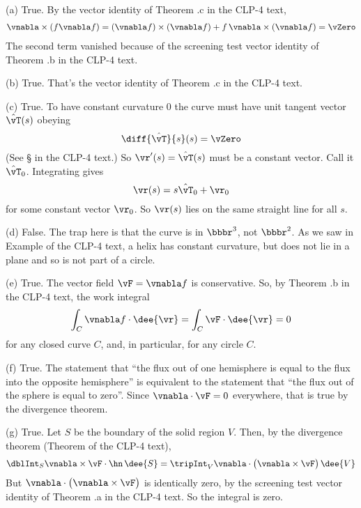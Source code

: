 \begin{solution} 
(a) True. By the vector identity of Theorem .c
in the CLP-4 text,
\begin{align*}
\vnabla\times(f \vnabla f )
=(\vnabla f) \times (\vnabla f)
  +f\,\vnabla\times (\vnabla f)
=\vZero
\end{align*}
The second term vanished because of the screening test vector identity
of Theorem .b in the CLP-4 text.

(b) True. That's the vector identity of Theorem .c in the CLP-4 text.

(c) True. To have constant curvature $0$ the curve must have 
unit tangent vector $\hat\vT(s)$ obeying
\begin{equation*}
\diff{\hat\vT}{s}(s)=\vZero
\end{equation*}
(See \S{} in the CLP-4 text.)
So $\vr'(s) = \hat\vT(s)$ must be a constant vector. Call it $\hat\vT_0$. Integrating gives
\begin{equation*}
\vr(s) = s\hat\vT_0 +\vr_0
\end{equation*}
for some constant vector $\vr_0$. So $\vr(s)$ lies
on the same straight line for all $s$.

(d) False. The trap here is that the curve is in $\bbbr^3$, not $\bbbr^2$. 
As we saw in Example  of the CLP-4 text, 
a helix has constant curvature, but does not lie in a plane and so 
is not part of a circle. 

(e) True. The vector field $\vF=\vnabla f$ is conservative. So, by
Theorem .b in the CLP-4 text, the
work integral 
\begin{equation*}
\int_C\vnabla f\cdot\dee{\vr}
=\int_C\vF\cdot\dee{\vr}
=0
\end{equation*}
for any closed curve $C$, and, in particular, for any circle $C$.

(f) True. The statement that 
 ``the flux out of one hemisphere is equal 
   to the flux into the opposite hemisphere''
is equivalent to the statement that
  ``the flux out of the sphere is equal to zero''.
Since $\vnabla\cdot\vF=0$ everywhere, that is true by the divergence
theorem.

(g) True. Let $S$ be the boundary of the solid region $V$.
Then, by the divergence theorem (Theorem  
of the CLP-4 text),
\begin{align*}
\dblInt_S\vnabla\times\vF\cdot\hn\,\dee{S}
=\tripInt_V \vnabla\cdot\big(\vnabla\times\vF\big)\,\dee{V}
\end{align*}
But $\vnabla\cdot\big(\vnabla\times\vF\big)$ is identically zero,
by the screening test vector identity of Theorem .a in the CLP-4 text. So the integral 
is zero.

\end{solution}

